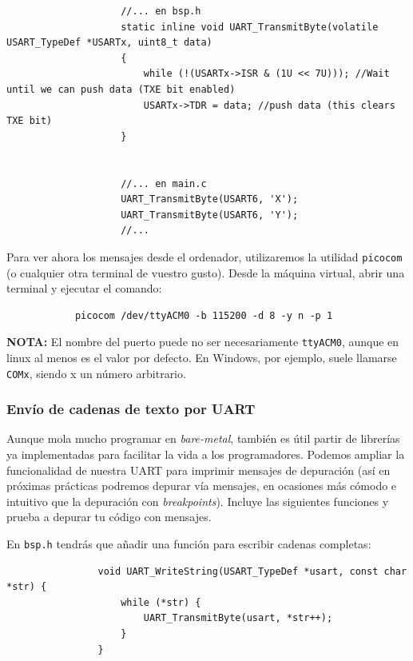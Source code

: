 \documentclass[../main.tex]{subfiles}
\begin{document}
\begin{enumerate}
                \begin{lstlisting}
                    //... en bsp.h
                    static inline void UART_TransmitByte(volatile USART_TypeDef *USARTx, uint8_t data)
                    {
                        while (!(USARTx->ISR & (1U << 7U))); //Wait until we can push data (TXE bit enabled)
                        USARTx->TDR = data; //push data (this clears TXE bit)
                    }


                    //... en main.c
                    UART_TransmitByte(USART6, 'X');
                    UART_TransmitByte(USART6, 'Y');
                    //...
                \end{lstlisting}
        \end{enumerate}
     
        Para ver ahora los mensajes desde el ordenador, utilizaremos la utilidad \texttt{picocom} (o cualquier otra terminal de vuestro gusto). Desde la máquina virtual, abrir una terminal y ejecutar el comando:

        \begin{lstlisting}
            picocom /dev/ttyACM0 -b 115200 -d 8 -y n -p 1
        \end{lstlisting}

        \textbf{NOTA:} El nombre del puerto puede no ser necesariamente \texttt{ttyACM0}, aunque en linux al menos es el valor por defecto. En Windows, por ejemplo, suele llamarse \texttt{COMx}, siendo x un número arbitrario.
        
        \subsubsection{Envío de cadenas de texto por UART}

            Aunque mola mucho programar en \emph{bare-metal}, también es útil partir de librerías ya implementadas para facilitar la vida a los programadores. Podemos ampliar la funcionalidad de nuestra UART para imprimir mensajes de depuración (así en próximas prácticas podremos depurar vía mensajes, en ocasiones más cómodo e intuitivo que la depuración con \emph{breakpoints}). Incluye las siguientes funciones y prueba a depurar tu código con mensajes.

            En \texttt{bsp.h} tendrás que añadir una función para escribir cadenas completas:

            \begin{lstlisting}
                void UART_WriteString(USART_TypeDef *usart, const char *str) {
                    while (*str) {
                        UART_TransmitByte(usart, *str++);
                    }
                }
            \end{lstlisting}
\end{document}
